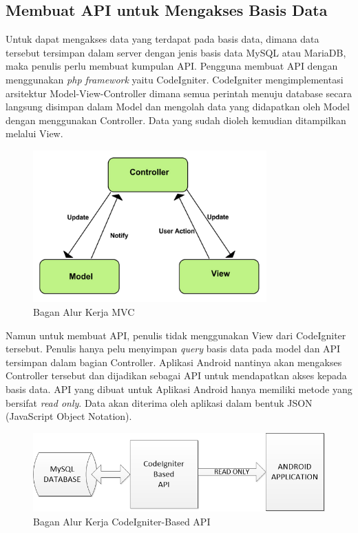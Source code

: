 	\subsection{Membuat API untuk Mengakses Basis Data}
		Untuk dapat mengakses data yang terdapat pada basis data, dimana data tersebut tersimpan dalam server dengan jenis basis data MySQL atau MariaDB, maka penulis perlu membuat kumpulan API. Pengguna membuat API dengan menggunakan \textit{php framework} yaitu CodeIgniter. CodeIgniter mengimplementasi arsitektur Model-View-Controller dimana semua perintah menuju database secara langsung disimpan dalam Model dan mengolah data yang didapatkan oleh Model dengan menggunakan Controller. Data yang sudah dioleh kemudian ditampilkan melalui View.
		\begin{figure}[H]
			\centering
			\includegraphics[width=0.8\textwidth]{gambar/mvc-arch}
			\caption{Bagan Alur Kerja MVC}
			\label{mvc-3}
		\end{figure}
		Namun untuk membuat API, penulis tidak menggunakan View dari CodeIgniter tersebut. Penulis hanya pelu menyimpan \textit{query} basis data pada model dan API tersimpan dalam bagian Controller. Aplikasi Android nantinya akan mengakses Controller tersebut dan dijadikan sebagai API untuk mendapatkan akses kepada basis data. API yang dibuat untuk Aplikasi Android hanya memiliki metode yang bersifat \textit{read only}. Data akan diterima oleh aplikasi dalam bentuk JSON (JavaScript Object Notation).
		\begin{figure}[H]
			\centering
			\includegraphics[width=1\textwidth]{gambar/api/codeigniter_based_api}
			\caption{Bagan Alur Kerja CodeIgniter-Based API}
			\label{ci_based_api}
		\end{figure}
